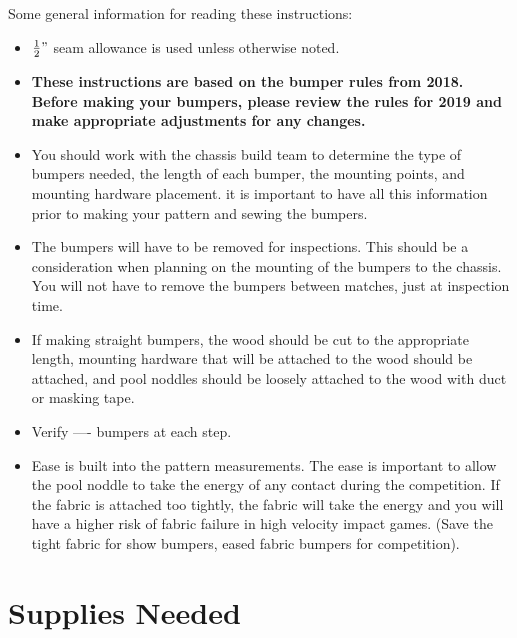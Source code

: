 \documentclass[
10pt, %
a4paper, %
oneside, %
headinclude,footinclude, %
BCOR5mm, %
]{scrartcl}
\begin{document}
Some general information for reading these instructions:
\begin{itemize}
	\item $\frac{1}{2}"$ seam allowance is used unless otherwise noted.
	\item \textbf{These instructions are based on the bumper rules from 2018. Before making your bumpers, please review the rules for 2019 and make appropriate adjustments for any changes.}
	\item You should work with the chassis build team to determine the type of bumpers needed, the length of each bumper, the mounting points, and mounting hardware placement. it is important to have all this information prior to making your pattern and sewing the bumpers.
	\item The bumpers will have to be removed for inspections. This should be a consideration when planning on the mounting of the bumpers to the chassis. You will not have to remove the bumpers between matches, just at inspection time.
	\item If making straight bumpers, the wood should be cut to the appropriate length, mounting hardware that will be attached to the wood should be attached, and pool noddles should be loosely attached to the wood with duct or masking tape.
	\item Verify ---- bumpers at each step.
	\item Ease is built into the pattern measurements. The ease is important to allow the pool noddle to take the energy of any contact during the competition. If the fabric is attached too tightly, the fabric will take the energy and you will have a higher risk of fabric failure in high velocity impact games. (Save the tight fabric for show bumpers, eased fabric bumpers for competition).
\end{itemize}

\section{Supplies Needed}
\end{document}

